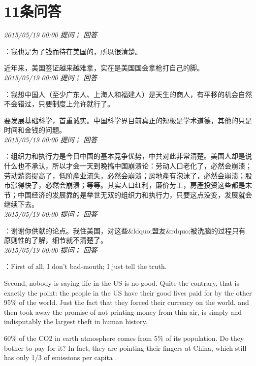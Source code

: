 \documentclass[twocolumn]{ctexart}
\begin{document}
\section{11条问答}

\textit{\hfill\noindent\small 2015/05/19 00:00 提问； 回答}

：我也是为了钱而待在美国的，所以很清楚。

近年来，美国签证越来越难拿，实在是美国国会拿枪打自己的脚。\\

\textit{\hfill\noindent\small 2015/05/19 00:00 提问； 回答}

：我想中国人（至少广东人、上海人和福建人）是天生的商人，有平移的机会自然不会错过，只要制度上允许就行了。

要发展基础科学，首重诚实。中国科学界目前真正的短板是学术道德，其他的只是时间和金钱的问题。\\

\textit{\hfill\noindent\small 2015/05/19 00:00 提问； 回答}

：组织力和执行力是今日中国的基本竞争优势，中共对此非常清楚。美国人却是说什么也不承认，所以才会一天到晚搞中国崩溃论：劳动人口老化了，必然会崩溃；劳动薪资提高了，低阶產业流失，必然会崩溃；房地產有泡沫了，必然会崩溃；股市涨得快了，必然会崩溃；等等。其实人口红利，廉价劳工，房產投资这些都是末节；中国经济的发展靠的是举世无双的组织力和执行力，只要这点没变，发展就会继续下去。\\

\textit{\hfill\noindent\small 2015/05/19 00:00 提问； 回答}

：谢谢你供献的论点。我住美国，对这些\&ldquo;盟友\&rdquo;被洗脑的过程只有原则性的了解，细节就不清楚了。\\

\textit{\hfill\noindent\small 2015/05/19 00:00 提问； 回答}

：First of all, I don't bad-mouth; I just tell the truth.

Second, nobody is saying life in the US is no good. Quite the contrary, that is exactly the point: the people in the US have their good lives paid for by the other 95\% of the world. Just the fact that they forced their currency on the world, and then took away the promise of not printing money from thin air, is simply and indisputably the largest theft in human history. 

60\% of the CO2 in earth atmosphere comes from 5\% of its population. Do they bother to pay for it? In fact, they are pointing their fingers at China, which still has only 1/3 of emissions per capita .
\end{document}
